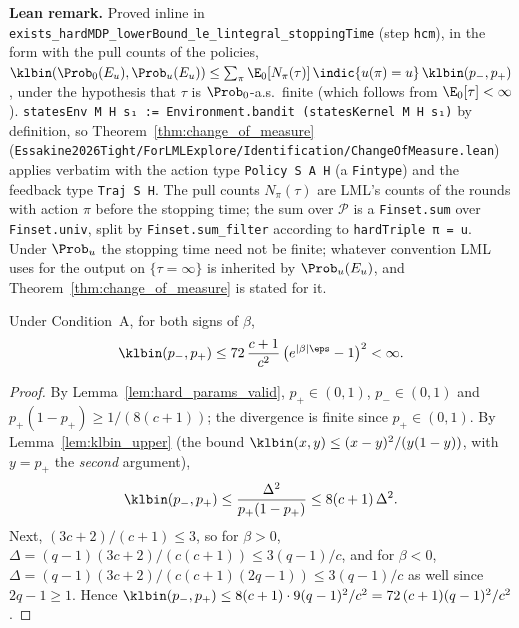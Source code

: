 \textbf{Lean remark.} Proved inline in \texttt{exists\_hardMDP\_lowerBound\_le\_lintegral\_stoppingTime}
(step \texttt{hcm}), in the form with the pull counts of the policies,
$\klbin(\Prob_0(E_u), \Prob_u(E_u)) \le \sum_\pi \E_0[N_\pi(\tau)]\,\indic\{u(\pi) = u\}\,\klbin(p_-, p_+)$,
under the hypothesis that $\tau$ is $\Prob_0$-a.s.\ finite (which follows from $\E_0[\tau] < \infty$).
\texttt{statesEnv M H s₁ := Environment.bandit (statesKernel M H s₁)} by
definition, so Theorem~\ref{thm:change_of_measure}
(\texttt{Essakine2026Tight/ForLMLExplore/Identification/ChangeOfMeasure.lean})
applies verbatim with the action type \texttt{Policy S A H} (a \texttt{Fintype}) and the
feedback type \texttt{Traj S H}. The pull counts $N_\pi(\tau)$ are LML's counts of the rounds
with action $\pi$ before the stopping time; the sum over $\mathcal P$ is a \texttt{Finset.sum}
over \texttt{Finset.univ}, split by \texttt{Finset.sum\_filter} according to
\texttt{hardTriple π = u}. Under $\Prob_u$ the stopping time need not be finite; whatever
convention LML uses for the output on $\{\tau = \infty\}$ is inherited by $\Prob_u(E_u)$, and
Theorem~\ref{thm:change_of_measure} is stated for it.

\begin{lemma}\label{lem:hard_kl_params}
\leanok
Under Condition~A, for both signs of $\beta$,
\[
  \klbin(p_-, p_+) \le 72\,\frac{c+1}{c^2}\,\big(e^{|\beta|\eps} - 1\big)^2 < \infty .
\]
\end{lemma}

\begin{proof}
\leanok
{}
By Lemma~\ref{lem:hard_params_valid}, $p_+ \in (0,1)$, $p_- \in (0,1)$ and
$p_+(1-p_+) \ge 1/(8(c+1))$; the divergence is finite since $p_+ \in (0,1)$. By Lemma~\ref{lem:klbin_upper}
(the bound $\klbin(x,y) \le (x-y)^2/(y(1-y))$, with $y = p_+$ the \emph{second} argument),
\[
  \klbin(p_-, p_+) \le \frac{\Delta^2}{p_+(1-p_+)} \le 8(c+1)\,\Delta^2 .
\]
Next, $(3c+2)/(c+1) \le 3$, so for $\beta > 0$, $\Delta = (q-1)(3c+2)/(c(c+1)) \le 3(q-1)/c$, and for
$\beta < 0$, $\Delta = (q-1)(3c+2)/(c(c+1)(2q-1)) \le 3(q-1)/c$ as well since $2q - 1 \ge 1$. Hence
$\klbin(p_-,p_+) \le 8(c+1)\cdot 9(q-1)^2/c^2 = 72\,(c+1)(q-1)^2/c^2$.
\end{proof}

